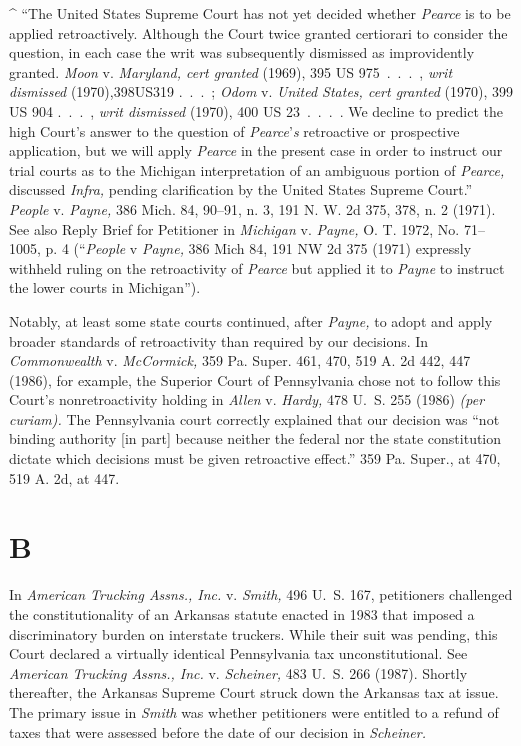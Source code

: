 {{{{  ^ ``The United States Supreme Court has not yet decided whether
\emph{Pearce} is to be applied retroactively. Although the Court twice
granted certiorari to consider the question, in each case the writ
was subsequently dismissed as improvidently granted. \emph{Moon} v.
\emph{Maryland, cert granted} (1969), 395 US 975~.~.~.~, \emph{writ
dismissed} (1970),398US319 .~.~.~; \emph{Odom} v. \emph{United States,
cert granted} (1970), 399 US 904 .~.~.~, \emph{writ dismissed} (1970),
400 US 23~.~.~.~. We decline to predict the high Court's answer
to the question of \emph{Pearce}'\emph{s} retroactive or prospective
application, but we will apply \emph{Pearce} in the present case in
order to instruct our trial courts as to the Michigan interpretation
of an ambiguous portion of \emph{Pearce,} discussed \emph{Infra,} pending
clarification by the United States Supreme Court.'' \emph{People}
v. \emph{Payne,} 386 Mich. 84, 90--91, n. 3, 191 N. W. 2d 375, 378,
n. 2 (1971). See also Reply Brief for Petitioner in \emph{Michigan} v.
\emph{Payne,} O. T. 1972, No. 71--1005, p. 4 (``\emph{People} v \emph{Payne,}
386 Mich 84, 191 NW 2d 375 (1971) expressly withheld \newpage  ruling on
the retroactivity of \emph{Pearce} but applied it to \emph{Payne} to instruct
the lower courts in Michigan'').

  Notably, at least some state courts continued, after \emph{Payne,} to
adopt and apply broader standards of retroactivity than required by our
decisions. In \emph{Commonwealth} v. \emph{McCormick,} 359 Pa. Super. 461,
470, 519 A. 2d 442, 447 (1986), for example, the Superior Court of
Pennsylvania chose not to follow this Court's nonretroactivity holding
in \emph{Allen} v. \emph{Hardy,} 478 U.~S. 255 (1986) \emph{(per curiam).}
The Pennsylvania court correctly explained that our decision was
``not binding authority [in part] because neither the federal nor the
state constitution dictate which decisions must be given retroactive
effect.'' 359 Pa. Super., at 470, 519 A. 2d, at 447.

\section{B}

  In \emph{American Trucking Assns., Inc.} v. \emph{Smith,} 496 U.~S.
167, petitioners challenged the constitutionality of an Arkansas
statute enacted in 1983 that imposed a discriminatory burden on
interstate truckers. While their suit was pending, \newpage  this Court
declared a virtually identical Pennsylvania tax unconstitutional. See
\emph{American Trucking Assns., Inc.} v. \emph{Scheiner,} 483 U.~S. 266
(1987). Shortly thereafter, the Arkansas Supreme Court struck down
the Arkansas tax at issue. The primary issue in \emph{Smith} was whether
petitioners were entitled to a refund of taxes that were assessed before
the date of our decision in \emph{Scheiner.}

}}}}
